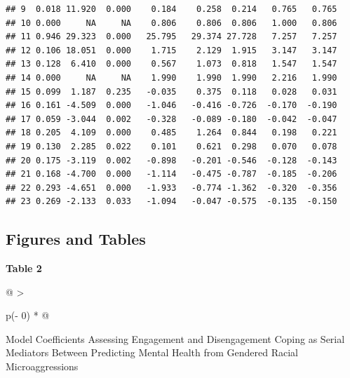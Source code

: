 \documentclass[
]{book}
\begin{document}
\begin{verbatim}
## 9  0.018 11.920  0.000    0.184    0.258  0.214   0.765   0.765
## 10 0.000     NA     NA    0.806    0.806  0.806   1.000   0.806
## 11 0.946 29.323  0.000   25.795   29.374 27.728   7.257   7.257
## 12 0.106 18.051  0.000    1.715    2.129  1.915   3.147   3.147
## 13 0.128  6.410  0.000    0.567    1.073  0.818   1.547   1.547
## 14 0.000     NA     NA    1.990    1.990  1.990   2.216   1.990
## 15 0.099  1.187  0.235   -0.035    0.375  0.118   0.028   0.031
## 16 0.161 -4.509  0.000   -1.046   -0.416 -0.726  -0.170  -0.190
## 17 0.059 -3.044  0.002   -0.328   -0.089 -0.180  -0.042  -0.047
## 18 0.205  4.109  0.000    0.485    1.264  0.844   0.198   0.221
## 19 0.130  2.285  0.022    0.101    0.621  0.298   0.070   0.078
## 20 0.175 -3.119  0.002   -0.898   -0.201 -0.546  -0.128  -0.143
## 21 0.168 -4.700  0.000   -1.114   -0.475 -0.787  -0.185  -0.206
## 22 0.293 -4.651  0.000   -1.933   -0.774 -1.362  -0.320  -0.356
## 23 0.269 -2.133  0.033   -1.094   -0.047 -0.575  -0.135  -0.150
\end{verbatim}

\hypertarget{figures-and-tables-2}{%
\subsection{Figures and Tables}\label{figures-and-tables-2}}

\textbf{Table 2 }

\begin{longtable}[]{@{}
  >{\raggedright\arraybackslash}p{(\columnwidth - 0\tabcolsep) * }@{}}
\toprule
\begin{minipage}[b]{\linewidth}\raggedright
Model Coefficients Assessing Engagement and Disengagement Coping as Serial Mediators Between Predicting Mental Health from Gendered Racial Microaggressions
\end{minipage} \\
\midrule
\endhead
\bottomrule
\end{longtable}
\end{document}
